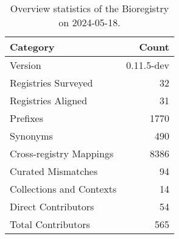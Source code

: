 \begin{table}
\caption{Overview statistics of the Bioregistry on 2024-05-18.}
\label{tab:bioregistry-summary}
\begin{tabular}{lr}
\toprule
Category & Count \\
\midrule
Version & 0.11.5-dev \\
Registries Surveyed & 32 \\
Registries Aligned & 31 \\
Prefixes & 1770 \\
Synonyms & 490 \\
Cross-registry Mappings & 8386 \\
Curated Mismatches & 94 \\
Collections and Contexts & 14 \\
Direct Contributors & 54 \\
Total Contributors & 565 \\
\bottomrule
\end{tabular}
\end{table}
